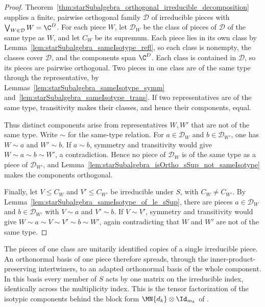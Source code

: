 \begin{proof}
    \leanok
    Theorem~\ref{thm:starSubalgebra_orthogonal_irreducible_decomposition} supplies a finite, pairwise orthogonal family $\mathcal{D}$ of
    irreducible pieces with $\bigvee_{W\in\mathcal{D}}W=\C^D$. For each piece $W$, let $\mathcal{D}_W$ be the class of pieces of $\mathcal{D}$
    of the same type as $W$, and let $C_W$ be its supremum. Each piece lies in its own class by Lemma~\ref{lem:starSubalgebra_sameIsotype_refl}, so
    each class is nonempty, the classes cover $\mathcal{D}$, and the components span $\C^D$. Each class is contained in $\mathcal{D}$, so
    its pieces are pairwise orthogonal. Two pieces in one class are of the same type through the representative, by
    Lemmas~\ref{lem:starSubalgebra_sameIsotype_symm} and~\ref{lem:starSubalgebra_sameIsotype_trans}. If two representatives
    are of the same type, transitivity makes their classes, and hence their components, equal.

    Thus distinct components arise from representatives $W,W'$ that are not of the same type. Write $\sim$ for the same-type relation. For
    $a\in\mathcal{D}_W$ and $b\in\mathcal{D}_{W'}$, one has $W\sim a$ and $W'\sim b$. If $a\sim b$, symmetry and transitivity would give
    $W\sim a\sim b\sim W'$, a contradiction. Hence no piece of $\mathcal{D}_W$ is of the same type as a piece of
    $\mathcal{D}_{W'}$, and Lemma~\ref{lem:starSubalgebra_isOrtho_sSup_not_sameIsotype} makes the
    components orthogonal.

    Finally, let $V\leq C_W$ and $V'\leq C_{W'}$ be irreducible under $S$, with $C_W\neq C_{W'}$. By
    Lemma~\ref{lem:starSubalgebra_sameIsotype_of_le_sSup}, there are pieces $a\in\mathcal{D}_W$ and $b\in\mathcal{D}_{W'}$ with $V\sim a$ and
    $V'\sim b$. If $V\sim V'$, symmetry and transitivity would give $W\sim a\sim V\sim V'\sim b\sim W'$, again contradicting that $W$ and
    $W'$ are not of the same type.
\end{proof}

The pieces of one class are unitarily identified copies of a single irreducible piece. An orthonormal basis of one piece therefore spreads,
through the inner-product-preserving intertwiners, to an adapted orthonormal basis of the whole component. In this basis every member of $S$ acts by one
matrix on the irreducible index, identically across the multiplicity index. This is the tensor factorization of the isotypic components behind the block
form $\MN{d_k}\otimes\Id_{m_k}$ of
\cite[Theorem~6.14]{Wolf2012Quantum}.

